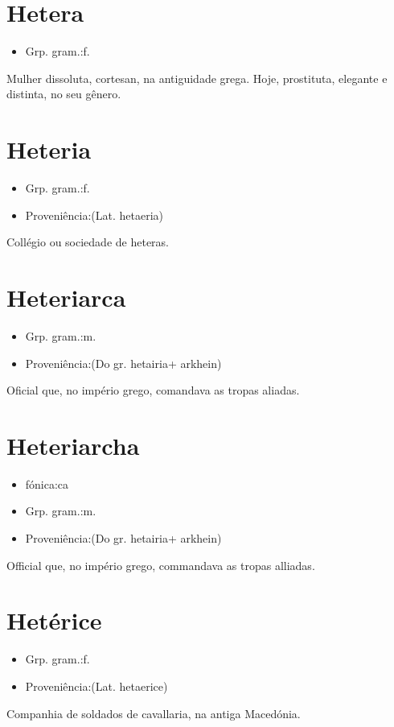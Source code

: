 \documentclass{article}
\begin{document}
\section{Hetera}
\begin{itemize}
\item {Grp. gram.:f.}
\end{itemize}
Mulher dissoluta, cortesan, na antiguidade grega.
Hoje, prostituta, elegante e distinta, no seu gênero.
\section{Heteria}
\begin{itemize}
\item {Grp. gram.:f.}
\end{itemize}
\begin{itemize}
\item {Proveniência:(Lat. \textunderscore hetaeria\textunderscore )}
\end{itemize}
Collégio ou sociedade de heteras.
\section{Heteriarca}
\begin{itemize}
\item {Grp. gram.:m.}
\end{itemize}
\begin{itemize}
\item {Proveniência:(Do gr. \textunderscore hetairia\textunderscore  + \textunderscore arkhein\textunderscore )}
\end{itemize}
Oficial que, no império grego, comandava as tropas aliadas.
\section{Heteriarcha}
\begin{itemize}
\item {fónica:ca}
\end{itemize}
\begin{itemize}
\item {Grp. gram.:m.}
\end{itemize}
\begin{itemize}
\item {Proveniência:(Do gr. \textunderscore hetairia\textunderscore  + \textunderscore arkhein\textunderscore )}
\end{itemize}
Official que, no império grego, commandava as tropas alliadas.
\section{Hetérice}
\begin{itemize}
\item {Grp. gram.:f.}
\end{itemize}
\begin{itemize}
\item {Proveniência:(Lat. \textunderscore hetaerice\textunderscore )}
\end{itemize}
Companhia de soldados de cavallaria, na antiga Macedónia.
\end{document}
